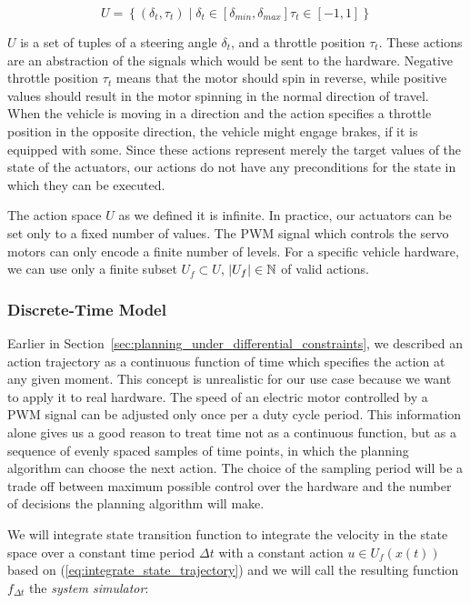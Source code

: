 \[
	U=\left\{ \left( \delta_t,\tau_t\right) \mid \delta_t\in\left[\delta_{min},\delta_{max}\right] \tau_t\in\left[-1, 1\right] \right\}
\]

$U$ is a set of tuples of a steering angle $\delta_t$, and a throttle position $\tau_t$. These actions are an abstraction of the signals which would be sent to the hardware. Negative throttle position $\tau_t$ means that the motor should spin in reverse, while positive values should result in the motor spinning in the normal direction of travel. When the vehicle is moving in a direction and the action specifies a throttle position in the opposite direction, the vehicle might engage brakes, if it is equipped with some. Since these actions represent merely the target values of the state of the actuators, our actions do not have any preconditions for the state in which they can be executed.

The action space $U$ as we defined it is infinite. In practice, our actuators can be set only to a fixed number of values. The \gls*{PWM} signal which controls the servo motors can only encode a finite number of levels. For a specific vehicle hardware, we can use only a finite subset $U_f\subset U$, $\left|{U_f}\right|\in\mathbb{N}$ of valid actions.

\subsubsection{Discrete-Time Model}

Earlier in Section~\ref{sec:planning_under_differential_constraints}, we described an action trajectory as a continuous function of time which specifies the action at any given moment. This concept is unrealistic for our use case because we want to apply it to real hardware. The speed of an electric motor controlled by a \gls{PWM} signal can be adjusted only once per a duty cycle period. This information alone gives us a good reason to treat time not as a continuous function, but as a sequence of evenly spaced samples of time points, in which the planning algorithm can choose the next action. The choice of the sampling period will be a trade off between maximum possible control over the hardware and the number of decisions the planning algorithm will make.

We will integrate state transition function to integrate the velocity in the state space over a constant time period $\Delta t$ with a constant action $u\in U_f(x(t))$ based on (\ref{eq:integrate_state_trajectory}) and we will call the resulting function $f_{\Delta t}$ the \textit{system simulator}:

